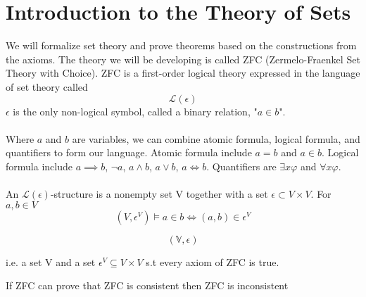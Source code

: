 
\section{Introduction to the Theory of Sets}

We will formalize set theory and prove theorems based on the constructions from the axioms. The theory we will be developing is called ZFC (Zermelo-Fraenkel Set Theory with Choice). ZFC is a first-order logical theory expressed in the language of set theory called \[\mathscr{L}(\epsilon)\]
$\epsilon$ is the only non-logical symbol, called a binary relation, "$a \in b$".
\\\\
Where $a$ and $b$ are variables, we can combine atomic formula, logical formula, and quantifiers to form our language. Atomic formula include $a = b$ and $a \in b$. Logical formula include $a \implies b$, $\neg a$, $a \wedge b$, $a \vee b$, $a \iff b$. Quantifiers are $\exists x \varphi$ and $\forall x \varphi$.
\\\\
An $\mathscr{L}(\epsilon)$-structure is a nonempty set V together with a set $\epsilon \subset V \times V$. For $a, b \in V$
\[(V, \epsilon^V) \models a \in b \iff (a, b) \in \epsilon^V\]
\begin{ex}
\[(\mathbb{V}, \epsilon)\]
\end{ex}
\begin{thm}  i.e. a set V and a set $\epsilon^V \subseteq V \times V$ s.t every axiom of ZFC is true.
\end{thm}
\begin{thm} If ZFC can prove that ZFC is consistent then ZFC is inconsistent 
\end{thm}
